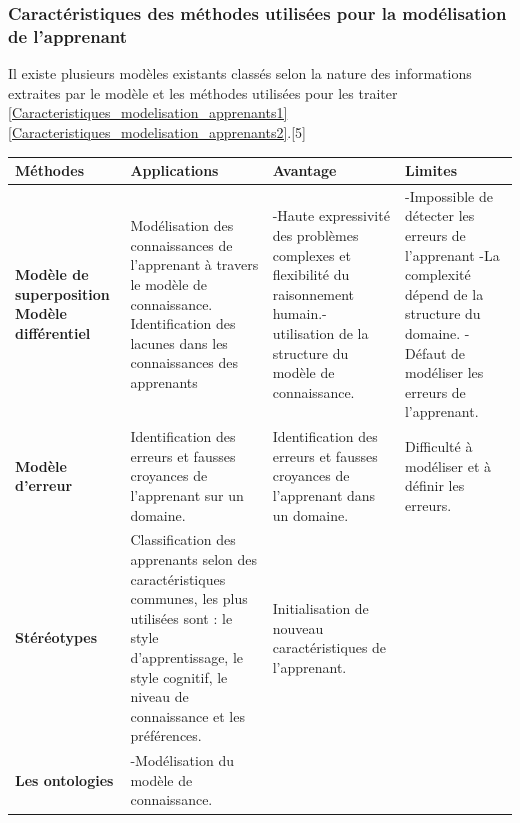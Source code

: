 \subsubsection{Caractéristiques des méthodes utilisées pour la modélisation de l'apprenant}
Il existe plusieurs modèles existants classés selon la nature des informations extraites par le modèle et les méthodes utilisées pour les traiter \ref{Caracteristiques_modelisation_apprenants1}\ref{Caracteristiques_modelisation_apprenants2}.[5]

\begin{table}[!htbp]
	\begin{tabular}{|m{3cm}|m{4cm}|m{4cm}|m{4cm}|} %
	\hline
	\rowcolor{blueforest}
	\color{white} \textbf{Méthodes} & \color{white} \textbf{Applications} & \color{white} \textbf{Avantage} & \color{white} \textbf{Limites} \\
	\hline\hline
	\textbf{Modèle de superposition} \newline {------------------} \newline  \textbf{Modèle différentiel}   &
	  Modélisation des connaissances  de l'apprenant à travers   le modèle de connaissance. \newline {-------------------------------} \newline  Identification des lacunes dans les connaissances des apprenants &
	  -Haute expressivité des   problèmes complexes et   flexibilité du raisonnement humain.\newline - utilisation de la structure   du modèle de connaissance.&
	  -Impossible de détecter   les erreurs de l'apprenant \newline -La complexité dépend de   la structure du domaine. \newline  - Défaut de modéliser   les erreurs de l'apprenant. \\ \hline
	  \textbf{Modèle d'erreur}  &
	  Identification des erreurs et fausses croyances de l'apprenant sur un domaine.&
	  Identification des erreurs et fausses croyances de l'apprenant dans un domaine.&
	  Difficulté à modéliser et à définir les erreurs. \\ \hline
	  \textbf{Stéréotypes}  &
	  Classification des apprenants selon des caractéristiques communes, les plus utilisées sont : le style d'apprentissage, le style cognitif, le niveau de connaissance et les préférences.&
	  Initialisation de nouveau caractéristiques de l'apprenant. & \\ \hline
	  \textbf{Les ontologies}  &
	  -Modélisation du modèle de connaissance. \newline

\end{tabular}
\end{table}

